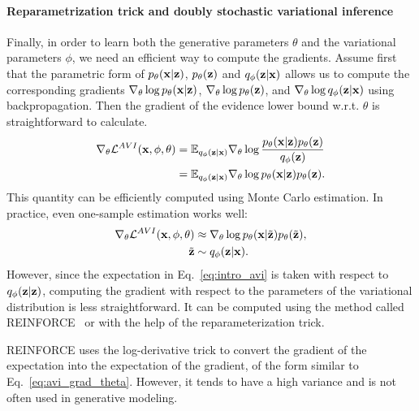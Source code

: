 \paragraph{Reparametrization trick and doubly stochastic variational inference}
Finally, in order to learn both the generative parameters $\theta$ and the variational parameters $\phi$, we need an efficient way to compute the gradients. 
Assume first that the parametric form of $p_{\theta}({\mathbf{x}}|{\mathbf{z}})$, $p_{\theta}({\mathbf{z}})$ and $q_{\phi}({\mathbf{z}}|{\mathbf{x}})$ allows us to compute the corresponding gradients $\nabla_{\theta}\log p_{\theta}({\mathbf{x}}|{\mathbf{z}})$, $\nabla_{\theta}\log p_{\theta}({\mathbf{z}})$, and $\nabla_{\theta}\log q_{\phi}({\mathbf{z}}|{\mathbf{x}})$ using backpropagation. 
Then the gradient of the evidence lower bound w.r.t. $\theta$ is straightforward to calculate.
\begin{equation}\label{eq:avi_grad_theta}
    \begin{aligned}
      \nabla_{\theta}\mathcal{L}^{AVI}(\rvx, \phi, \theta) 
      &= \E_{q_{\phi}(\rvz|\rvx)} \nabla_{\theta} \log  \frac{p_{\theta}(\rvx|\rvz)p_{\theta}(\rvz)}{q_{\phi}(\rvz)} \\
      &= \E_{q_{\phi}(\rvz|\rvx)} \nabla_{\theta} \log p_{\theta}(\rvx|\rvz)p_{\theta}(\rvz).
    \end{aligned}
\end{equation}
This quantity can be efficiently computed using Monte Carlo estimation. In practice, even one-sample estimation works well:
\begin{equation}
\begin{aligned}
    \nabla_{\theta}\mathcal{L}^{AVI}({\mathbf{x}}, \phi, \theta) &\approx \nabla_{\theta} \log p_{\theta}({\mathbf{x}}|\tilde{{\mathbf{z}}})p_{\theta}(\tilde{{\mathbf{z}}}),\\
    \tilde{{\mathbf{z}}} &\sim q_{\phi}({\mathbf{z}}|{\mathbf{x}}).
    \end{aligned}
\end{equation}
However, since the expectation in Eq.~\ref{eq:intro_avi} is taken with respect to $q_{\phi}({\mathbf{z}}|{\mathbf{z}})$, computing the gradient with respect to the parameters of the variational distribution is less straightforward.
It can be computed using the method called REINFORCE~\citep{williams1992simple} or with the help of the reparameterization trick. 

REINFORCE uses the log-derivative trick to convert the gradient of the expectation into the expectation of the gradient, of the form similar to Eq.~\ref{eq:avi_grad_theta}. 
However, it tends to have a high variance and is not often used in generative modeling. 

